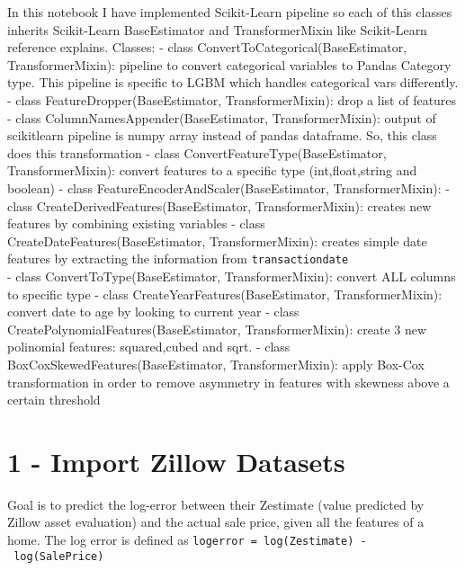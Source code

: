 \documentclass[11pt]{article}
\begin{document}
In this notebook I have implemented Scikit-Learn pipeline so each of
this classes inherits Scikit-Learn BaseEstimator and TransformerMixin
like Scikit-Learn reference explains. Classes: - class
ConvertToCategorical(BaseEstimator, TransformerMixin): pipeline to
convert categorical variables to Pandas Category type. This pipeline is
specific to LGBM which handles categorical vars differently. - class
FeatureDropper(BaseEstimator, TransformerMixin): drop a list of features
- class ColumnNamesAppender(BaseEstimator, TransformerMixin): output of
scikitlearn pipeline is numpy array instead of pandas dataframe. So,
this class does this transformation - class
ConvertFeatureType(BaseEstimator, TransformerMixin): convert features to
a specific type (int,float,string and boolean) - class
FeatureEncoderAndScaler(BaseEstimator, TransformerMixin): - class
CreateDerivedFeatures(BaseEstimator, TransformerMixin): creates new
features by combining existing variables - class
CreateDateFeatures(BaseEstimator, TransformerMixin): creates simple date
features by extracting the information from \texttt{transactiondate}\\
- class ConvertToType(BaseEstimator, TransformerMixin): convert ALL
columns to specific type - class CreateYearFeatures(BaseEstimator,
TransformerMixin): convert date to age by looking to current year -
class CreatePolynomialFeatures(BaseEstimator, TransformerMixin): create
3 new polinomial features: squared,cubed and sqrt. - class
BoxCoxSkewedFeatures(BaseEstimator, TransformerMixin): apply Box-Cox
transformation in order to remove asymmetry in features with skewness
above a certain threshold

    \hypertarget{import-zillow-datasets}{%
\section{1 - Import Zillow Datasets}\label{import-zillow-datasets}}

Goal is to predict the log-error between their Zestimate (value
predicted by Zillow asset evaluation) and the actual sale price, given
all the features of a home. The log error is defined as
\texttt{logerror\ =\ log(Zestimate)\ -\ log(SalePrice)}
\end{document}
